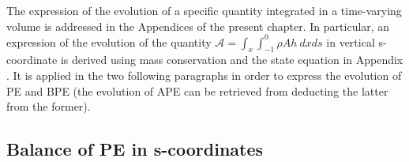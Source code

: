 The expression of the evolution of a specific quantity integrated in a time-varying volume is addressed in the Appendices  of the present chapter. In particular, an expression of the evolution of the quantity 
$\mathcal{A}=\int_x\int_{-1}^0\rho A h \ dx ds$
in vertical s-coordinate is derived using mass conservation and the state equation in Appendix . It is applied in the two following paragraphs in order to express the evolution of PE and BPE (the evolution of APE can be retrieved from deducting the latter from the former).


\subsection{Balance of PE in s-coordinates}

